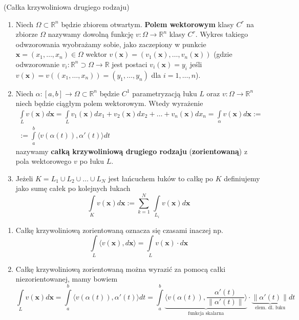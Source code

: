 \begin{df}{(Całka krzywoliniowa drugiego rodzaju)}
	\begin{enumerate}
		\item
		Niech $\Omega\subset\mathbb{R}^{n}$ będzie zbiorem otwartym. \textbf{Polem wektorowym} klasy $C^{r}$ na zbiorze $\Omega$ nazywamy dowolną funkcję $v:\Omega\rightarrow \mathbb{R}^{n}$ klasy $C^{r}$. Wykres takiego odwzorowania wyobrażamy sobie, jako zaczepiony w punkcie $\mathbf{x}=(x_1,\ldots,x_n)\in\Omega$ wektor $v(\mathbf{x})=(v_1(\mathbf{x}),\ldots,v_n(\mathbf{x}))$ (gdzie odwzorowanie \mbox{$v_{i}:\mathbb{R}^{n}\supset\Omega\rightarrow\mathbb{R}$} jest postaci $v_{i}(\mathbf{x})=y_{i}$ jeśli $v(\mathbf{x})=v((x_{1},\ldots,x_{n}))=(y_{1},\ldots,y_{n})$ dla $i=1,\ldots,n$).
		\item
		Niech $\alpha:[a,b]\rightarrow \Omega\subset\mathbb{R}^{n}$ będzie $C^{1}$ parametryzacją łuku $L$ oraz $v:\Omega\rightarrow \mathbb{R}^{n}$ niech będzie ciągłym polem wektorowym. Wtedy wyrażenie
		\begin{gather}
		\int\limits_{L}v(\mathbf{x})d\mathbf{x}=\int\limits_{L}v_{1}(\mathbf{x})dx_{1}+v_{2}(\mathbf{x})dx_{2}+\ldots+v_{n}(\mathbf{x})dx_{n}=\int\limits_{\alpha}v(\mathbf{x})d\mathbf{x}:=\nonumber\\
		:=\int\limits_{a}^{b}\langle v(\alpha(t)),\alpha'(t)\rangle dt\nonumber
		\end{gather}
		nazywamy \textbf{całką krzywoliniową drugiego rodzaju} (\textbf{zorientowaną}) z pola wektorowego $v$ po łuku $L$.
		\item
		Jeżeli $K=L_1\cup L_2\cup \ldots \cup L_N$ jest łańcuchem łuków to całkę po $K$ definiujemy jako sumę całek po kolejnych łukach $$\int\limits_K v(\mathbf{x})d\mathbf{x}:=\sum_{k=1}^{N}\,\int\limits_{L_{i}}v(\mathbf{x})d\mathbf{x}$$
	\end{enumerate}
\end{df}

\begin{uwg}
	\begin{enumerate}
		\item
		Całkę krzywoliniową zorientowaną oznacza się czasami inaczej np.
		$$\int\limits_{L}\langle v(\mathbf{x}),d\mathbf{x}\rangle=\int\limits_{L}v(\mathbf{x})\cdot d\mathbf{x}$$
		\item
		Całkę krzywoliniową zorientowaną można wyrazić za pomocą całki niezorientowanej, mamy bowiem
		$$\int\limits_{L}v(\mathbf{x})d\mathbf{x}=\int\limits_{a}^{b}\langle v(\alpha(t)),\alpha'(t)\rangle dt=\int\limits_{a}^{b}\underbrace{\Big\langle v(\alpha(t)),\frac{\alpha'(t)}{\|\alpha'(t)\|}\Big\rangle}_{\textrm{funkcja skalarna}}\cdot\underbrace{\|\alpha'(t)\|}_{\textrm{elem. dl. łuku}} dt$$
	\end{enumerate}
\end{uwg}

